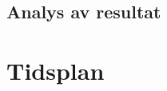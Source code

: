 \documentclass[11pt,a4paper,oneside]{book}
\begin{document}
\section{Analys av resultat}

\chapter{Tidsplan}




\end{document}
